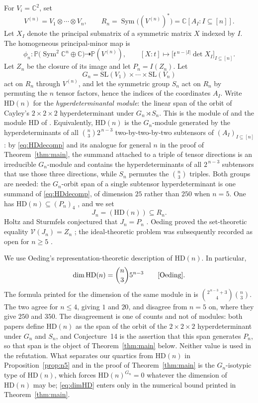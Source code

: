\documentclass[11pt]{amsart}
\theoremstyle{remark}
\newcommand{\C}{\mathbb C}
\newcommand{\PP}{\mathbb P}
\newcommand{\HD}{\mathrm{HD}}
\newcommand{\Sym}{\operatorname{Sym}}
\begin{document}
For \(V_i=\C^2\), set
\[
  V^{(n)}=V_1\otimes\cdots\otimes V_n,
  \qquad
  R_n=\Sym\bigl((V^{(n)})^*\bigr)
      =\C[A_I:I\subseteq[n]].
\]
Let \(X_I\) denote the principal submatrix of a symmetric matrix \(X\)
indexed by \(I\). The homogeneous principal-minor map is
\[
  \phi_n:\PP\bigl(\Sym^2\C^n\oplus\C\bigr)
  \dashrightarrow \PP(V^{(n)}),
  \qquad
  [X:t]\longmapsto
  \bigl[t^{\,n-|I|}\det X_I\bigr]_{I\subseteq[n]}.
\]
Let \(Z_n\) be the closure of its image and let \(P_n=I(Z_n)\).
Let
\[
  G_n=\mathrm{SL}(V_1)\times\cdots\times\mathrm{SL}(V_n)
\]
act on \(R_n\) through \(V^{(n)}\), and let the symmetric group \(S_n\)
act on \(R_n\) by permuting the \(n\) tensor factors, hence the indices of
the coordinates \(A_I\). Write \(\HD(n)\) for the \emph{hyperdeterminantal
module}: the linear span of the orbit of Cayley's \(2\times2\times2\)
hyperdeterminant under \(G_n\rtimes S_n\). This is the module of
\cite[\S6]{HS} and the module \(\HD\) of \cite[\S5]{Oeding}. Equivalently,
\(\HD(n)\) is the \(G_n\)-module generated by the hyperdeterminants of all
\(\binom n32^{\,n-3}\) two-by-two-by-two subtensors of
\((A_I)_{I\subseteq[n]}\): by \eqref{eq:HDdecomp} and its analogue for
general \(n\) in the proof of Theorem~\ref{thm:main}, the summand attached
to a triple of tensor directions is an irreducible \(G_n\)-module and
contains the hyperdeterminants of all \(2^{\,n-3}\) subtensors that use
those three directions, while \(S_n\) permutes the \(\binom n3\) triples.
Both groups are needed: the \(G_n\)-orbit span of a single subtensor
hyperdeterminant is one summand of \eqref{eq:HDdecomp}, of dimension
\(25\) rather than \(250\) when \(n=5\). One has \(\HD(n)\subseteq(P_n)_4\)
\cite[Proposition~5.5]{Oeding}, and we set
\[
  J_n=(\HD(n))\subseteq R_n.
\]
Holtz and Sturmfels conjectured that \(J_n=P_n\)
\cite[Conjecture~14]{HS}. Oeding proved the set-theoretic equality
\(\mathcal V(J_n)=Z_n\) \cite[Theorem~1.3]{Oeding}; the ideal-theoretic
problem was subsequently recorded as open for \(n\geq5\)
\cite[p.~1194]{HO}.

We use Oeding's representation-theoretic description of \(\HD(n)\). In
particular,
\begin{equation}\label{eq:dimHD}
  \dim\HD(n)=\binom n3 5^{n-3}
  \qquad\text{\cite[Observation~5.1]{Oeding}.}
\end{equation}
The formula printed for the dimension of the same module in \cite[\S6]{HS}
is \(\binom{2^{\,n-3}+3}{4}\binom n3\). The two agree for \(n\leq4\),
giving \(1\) and \(20\), and disagree from \(n=5\) on, where they give
\(250\) and \(350\). The disagreement is one of counts and not of modules:
both papers define \(\HD(n)\) as the span of the orbit of the
\(2\times2\times2\) hyperdeterminant under \(G_n\) and \(S_n\), and
Conjecture~14 is the assertion that this span generates \(P_n\), so that
span is the object of Theorem~\ref{thm:main} below. Neither value is used
in the refutation. What separates our quartics from \(\HD(n)\) in
Proposition~\ref{prop:n5} and in the proof of Theorem~\ref{thm:main} is the
\(G_n\)-isotypic type of \(\HD(n)\), which forces \(\HD(n)^{G_n}=0\)
whatever the dimension of \(\HD(n)\) may be; \eqref{eq:dimHD} enters only
in the numerical bound printed in Theorem~\ref{thm:main}.
\end{document}
